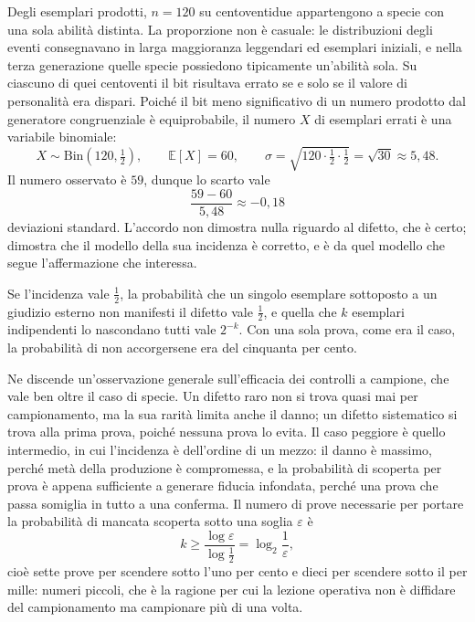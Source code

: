 Degli esemplari prodotti, $n = 120$ su centoventidue appartengono a specie con una sola abilità distinta. La proporzione non è casuale: le distribuzioni degli eventi consegnavano in larga maggioranza leggendari ed esemplari iniziali, e nella terza generazione quelle specie possiedono tipicamente un'abilità sola. Su ciascuno di quei centoventi il bit risultava errato se e solo se il valore di personalità era dispari. Poiché il bit meno significativo di un numero prodotto dal generatore congruenziale è equiprobabile, il numero $X$ di esemplari errati è una variabile binomiale:
\begin{equation}
X \sim \mathrm{Bin}\!\left(120, \tfrac{1}{2}\right), \qquad
\mathbb{E}[X] = 60, \qquad
\sigma = \sqrt{120 \cdot \tfrac{1}{2} \cdot \tfrac{1}{2}} = \sqrt{30} \approx 5{,}48 .
\end{equation}
Il numero osservato è $59$, dunque lo scarto vale
\begin{equation}
\frac{59 - 60}{5{,}48} \approx -0{,}18
\end{equation}
deviazioni standard. L'accordo non dimostra nulla riguardo al difetto, che è certo; dimostra che il modello della sua incidenza è corretto, e è da quel modello che segue l'affermazione che interessa.

Se l'incidenza vale $\tfrac12$, la probabilità che un singolo esemplare sottoposto a un giudizio esterno non manifesti il difetto vale $\tfrac12$, e quella che $k$ esemplari indipendenti lo nascondano tutti vale $2^{-k}$. Con una sola prova, come era il caso, la probabilità di non accorgersene era del cinquanta per cento.

Ne discende un'osservazione generale sull'efficacia dei controlli a campione, che vale ben oltre il caso di specie. Un difetto raro non si trova quasi mai per campionamento, ma la sua rarità limita anche il danno; un difetto sistematico si trova alla prima prova, poiché nessuna prova lo evita. Il caso peggiore è quello intermedio, in cui l'incidenza è dell'ordine di un mezzo: il danno è massimo, perché metà della produzione è compromessa, e la probabilità di scoperta per prova è appena sufficiente a generare fiducia infondata, perché una prova che passa somiglia in tutto a una conferma. Il numero di prove necessarie per portare la probabilità di mancata scoperta sotto una soglia $\varepsilon$ è
\begin{equation}
k \geq \frac{\log \varepsilon}{\log \tfrac{1}{2}} = \log_2 \frac{1}{\varepsilon},
\end{equation}
cioè sette prove per scendere sotto l'uno per cento e dieci per scendere sotto il per mille: numeri piccoli, che è la ragione per cui la lezione operativa non è diffidare del campionamento ma campionare più di una volta.

